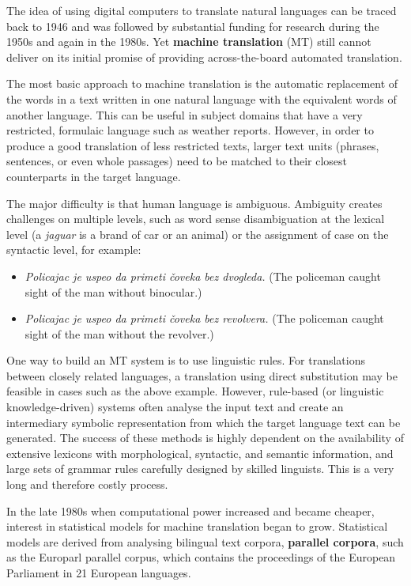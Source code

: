 \begin{multicols}{2}
The idea of using digital computers to translate natural languages can be traced back to 1946 and was followed by substantial funding for research during the 1950s and again in the 1980s. Yet \textbf{machine translation} (MT) still cannot deliver on its initial promise of providing across-the-board automated translation.

The most basic approach to machine translation is the automatic replacement of the words in a text written in one natural language with the equivalent words of another language. This can be useful in subject domains that have a very restricted, formulaic language such as weather reports.  However, in order to produce a good translation of less restricted texts, larger text units (phrases, sentences, or even whole passages) need to be matched to their closest counterparts in the target language. 


The major difficulty is that human language is ambiguous. Ambiguity creates challenges on multiple levels, such as word sense disambiguation at the lexical level (a \textit{jaguar} is a brand of car or an animal) or the assignment of case on the syntactic level, for example:

\begin{itemize}
\item \textit{Policajac je uspeo da primeti čoveka bez dvogleda.} (The policeman caught sight of the man without binocular.)
\item \textit{Policajac je uspeo da primeti čoveka bez revolvera.} (The policeman caught sight of the man without the revolver.)
\end{itemize}


One way to build an MT system is to use linguistic rules. For translations between closely related languages, a translation using direct substitution may be feasible in cases such as the above example. However, rule-based (or linguistic knowledge-driven) systems often analyse the input text and create an intermediary symbolic representation from which the target language text can be generated. The success of these methods is highly dependent on the availability of extensive lexicons with morphological, syntactic, and semantic information, and large sets of grammar rules carefully designed by skilled linguists. This is a very long and therefore costly process.

In the late 1980s when computational power increased and became cheaper, interest in statistical models for machine translation began to grow. Statistical models are derived from analysing bilingual text corpora, \textbf{parallel corpora}, such as the Europarl parallel corpus, which contains the proceedings of the European Parliament in 21 European languages. 


\end{multicols}

